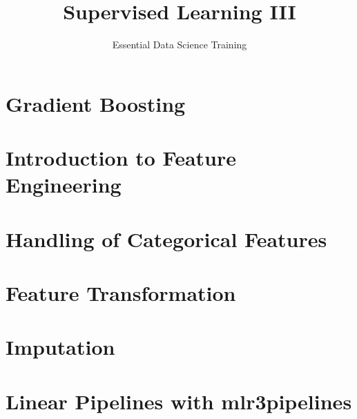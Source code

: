 \documentclass[13pt,compress]{beamer}
\title{Supervised Learning III}
\author{Essential Data Science Training}
\date{}
\begin{document}


\frame{\titlepage}

\section{Gradient Boosting}




\section{Introduction to Feature Engineering}



\section{Handling of Categorical Features}


\section{Feature Transformation}

\section{Imputation}



\section{Linear Pipelines with mlr3pipelines}

\end{document}
